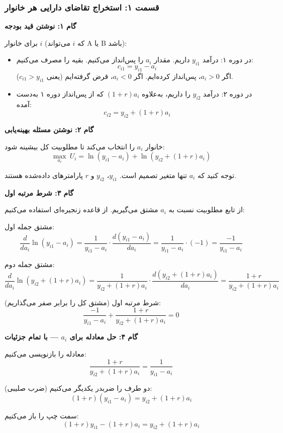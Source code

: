 \documentclass[12pt,a4paper]{article}
\begin{document}
\subsubsection{قسمت ۱: استخراج تقاضای دارایی هر خانوار}

\textbf{گام ۱: نوشتن قید بودجه}

برای خانوار $i$ (که $i$ می‌تواند A یا B باشد):

\begin{itemize}
	\item در دوره ۱: درآمد $y_{i1}$ داریم. مقدار $a_i$ را پس‌انداز می‌کنیم. بقیه را مصرف می‌کنیم:
	      \[
		      c_{i1} = y_{i1} - a_i
	      \]
	      اگر $a_i > 0$، پس‌انداز کرده‌ایم. اگر $a_i < 0$، قرض گرفته‌ایم (یعنی $c_{i1} > y_{i1}$).

	\item در دوره ۲: درآمد $y_{i2}$ را داریم، به‌علاوه $(1+r)a_i$ که از پس‌انداز دوره ۱ به‌دست آمده:
	      \[
		      c_{i2} = y_{i2} + (1+r) a_i
	      \]
\end{itemize}

\textbf{گام ۲: نوشتن مسئله بهینه‌یابی}

خانوار $a_i$ را انتخاب می‌کند تا مطلوبیت کل بیشینه شود:
\[
	\max_{a_i} \ U_i = \ln(y_{i1} - a_i) + \ln(y_{i2} + (1+r) a_i)
\]

توجه کنید که $a_i$ تنها متغیر تصمیم است. $y_{i1}$، $y_{i2}$ و $r$ پارامترهای داده‌شده هستند.

\textbf{گام ۳: شرط مرتبه اول}

از تابع مطلوبیت نسبت به $a_i$ مشتق می‌گیریم. از قاعده زنجیره‌ای استفاده می‌کنیم:

مشتق جمله اول:
\[
	\frac{d}{da_i} \ln(y_{i1} - a_i) = \frac{1}{y_{i1} - a_i} \cdot \frac{d(y_{i1} - a_i)}{da_i} = \frac{1}{y_{i1} - a_i} \cdot (-1) = \frac{-1}{y_{i1} - a_i}
\]

مشتق جمله دوم:
\[
	\frac{d}{da_i} \ln(y_{i2} + (1+r) a_i) = \frac{1}{y_{i2} + (1+r) a_i} \cdot \frac{d(y_{i2} + (1+r)a_i)}{da_i} = \frac{1+r}{y_{i2} + (1+r)a_i}
\]

شرط مرتبه اول (مشتق کل را برابر صفر می‌گذاریم):
\[
	\frac{-1}{y_{i1} - a_i} + \frac{1+r}{y_{i2} + (1+r) a_i} = 0
\]

\textbf{گام ۴: حل معادله برای $a_i$ — با تمام جزئیات}

معادله را بازنویسی می‌کنیم:
\[
	\frac{1+r}{y_{i2} + (1+r) a_i} = \frac{1}{y_{i1} - a_i}
\]

دو طرف را ضربدر یکدیگر می‌کنیم (ضرب صلیبی):
\[
	(1+r)(y_{i1} - a_i) = y_{i2} + (1+r) a_i
\]

سمت چپ را باز می‌کنیم:
\[
	(1+r) y_{i1} - (1+r) a_i = y_{i2} + (1+r) a_i
\]
\end{document}
